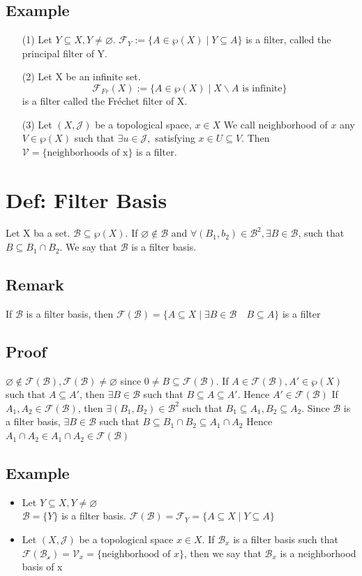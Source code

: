 \documentclass{book}
\begin{document}
\subsection{Example}
\begin{itemize}
    \item [(1)]Let $Y\subseteq X, Y\not=\varnothing.$ $\mathcal{F}_Y:=\{A\in \wp(X)\mid Y\subseteq A\}$ is a filter, called the principal filter of Y.
    \item [(2)]Let X be an infinite set.$$\mathcal{F}_{Fr}(X):=\{A\in \wp(X)\mid X\backslash A\text{ is infinite}\}$$ is a filter called the Fréchet filter of X.
    \item [(3)]Let $(X,\mathcal{J} )$ be a topological space, $x\in X$ We call neighborhood of $x$ any $V\in \wp(X)$ such that $\exists u\in\mathcal{J} ,$ satisfying $x\in U\subseteq V$. Then $\mathcal{V}=\{\text{neighborhoods of x}\}$ is a filter. 
\end{itemize}

\section{Def: Filter Basis}
Let X ba a set. $\mathscr{B}\subseteq\wp(X).$ If $\varnothing\not\in\mathscr{B}$ and $\forall (B_1,b_2)\in\mathscr{B}^2,\exists B\in\mathscr{B}$, such that $B\subseteq B_1\cap B_2$. We say that $\mathscr{B}$ is a filter basis.
\subsection{Remark}
If $\mathscr{B}$ is a filter basis, then $\mathcal{F}(\mathscr{B})=\{A\subseteq X\mid \exists B\in\mathscr{B}\quad B\subseteq A\}$ is a filter
\subsection*{Proof}
$\varnothing\not\in \mathcal{F}(\mathscr{B}),\mathcal{F}(\mathscr{B})\not=\varnothing$ since $0\not=B\subseteq \mathcal{F}(\mathscr{B})$. If $A\in\mathcal{F}(\mathscr{B}),A'\in\wp(X)$such that $A\subseteq A'$, then $\exists B\in \mathscr{B}$ such that $B\subseteq A\subseteq A'$. Hence $A'\in\mathcal{F}(\mathscr{B})$ If $A_1,A_2\in\mathcal{F}(\mathscr{B})$, then $\exists(B_1,B_2)\in\mathscr{B}^2$ such that $B_1\subseteq A_1, B_2\subseteq A_2$. Since $\mathscr{B}$ is a filter basis, $\exists B\in\mathscr{B}$ such that $B\subseteq B_1\cap B_2\subseteq A_1\cap A_2$ Hence $A_1\cap A_2\in A_1\cap A_2\in \mathcal{F}(\mathscr{B})$
\subsection{Example}
\begin{itemize}
    \item Let $Y\subseteq X, Y\not=\varnothing$ \\$\mathscr{B}=\{Y\}$ is a filter basis. $\mathcal{F}(\mathscr{B})=\mathcal{F}_Y=\{A\subseteq X\mid Y\subseteq A\}$
    \item Let $(X,\mathcal{J})$ be a topological space $x\in X$. If $\mathscr{B}_x$ is a filter basis such that $\mathcal{F}(\mathscr{B_x})=\mathcal{V}_x=\{\text{neighborhood of }x\}$, then we say that $\mathscr{B}_x$ is a neighborhood basis of x
\end{itemize}
\end{document}
